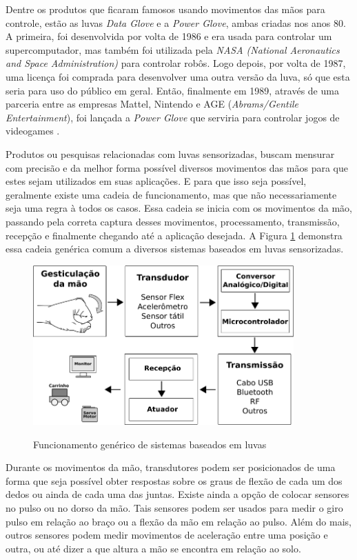 \documentclass[
	12pt,				%
	openright,			%
	oneside,			%
	a4paper,			%
	english,			%
	brazil				%
	]{abntex2}
\begin{document}
		Dentre os produtos que ficaram famosos usando movimentos das mãos para controle, estão as luvas \textit{Data Glove} e a \textit{Power Glove}, ambas criadas nos anos 80. A primeira, foi desenvolvida por volta de 1986 e era usada para controlar um supercomputador, mas também foi utilizada pela \textit{NASA (National Aeronautics and Space Administration)} para controlar robôs. Logo depois, por volta de 1987, uma licença foi comprada para desenvolver uma outra versão da luva, só que esta seria para uso do público em geral. Então, finalmente em 1989, através de uma parceria entre as empresas Mattel, Nintendo e AGE (\textit{Abrams/Gentile Entertainment}), foi lançada a \textit{Power Glove} que serviria para controlar jogos de videogames \cite{dana1989powerglove}.

		Produtos ou pesquisas relacionadas com luvas sensorizadas, buscam mensurar com precisão e da melhor forma possível diversos movimentos das mãos para que estes sejam utilizados em suas aplicações. E para que isso seja possível, geralmente existe uma cadeia de funcionamento, mas que não necessariamente seja uma regra à todos os casos. Essa cadeia se inicia com os movimentos da mão, passando pela correta captura desses movimentos, processamento, transmissão, recepção e finalmente chegando até a aplicação desejada. A Figura \ref{Fig:flowchart1} demonstra essa cadeia genérica comum a diversos sistemas baseados em luvas sensorizadas.

		\begin{figure}[h!]
			\centering
			\caption{Funcionamento genérico de sistemas baseados em luvas}
  		\includegraphics[width=10cm]{./figures/flowchart1.png}
  		\label{Fig:flowchart1}
		\end{figure}

		Durante os movimentos da mão, transdutores podem ser posicionados de uma forma que seja possível obter respostas sobre os graus de flexão de cada um dos dedos ou ainda de cada uma das juntas. Existe ainda a opção de colocar sensores no pulso ou no dorso da mão. Tais sensores podem ser usados para medir o giro pulso em relação ao braço ou a flexão da mão em relação ao pulso. Além do mais, outros sensores podem medir movimentos de aceleração entre uma posição e outra, ou até dizer a que altura a mão se encontra em relação ao solo.
		
\end{document}
